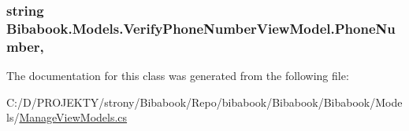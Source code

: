 \subsubsection[{Phone\+Number}]{\setlength{\rightskip}{0pt plus 5cm}string Bibabook.\+Models.\+Verify\+Phone\+Number\+View\+Model.\+Phone\+Number\hspace{0.3cm}{\ttfamily [get]}, {\ttfamily [set]}}\label{class_bibabook_1_1_models_1_1_verify_phone_number_view_model_a3d11e035cccb1906b12a89240ad484a1}


The documentation for this class was generated from the following file\+:\begin{DoxyCompactItemize}
\item 
C\+:/\+D/\+P\+R\+O\+J\+E\+K\+T\+Y/strony/\+Bibabook/\+Repo/bibabook/\+Bibabook/\+Bibabook/\+Models/\hyperlink{_manage_view_models_8cs}{Manage\+View\+Models.\+cs}\end{DoxyCompactItemize}
